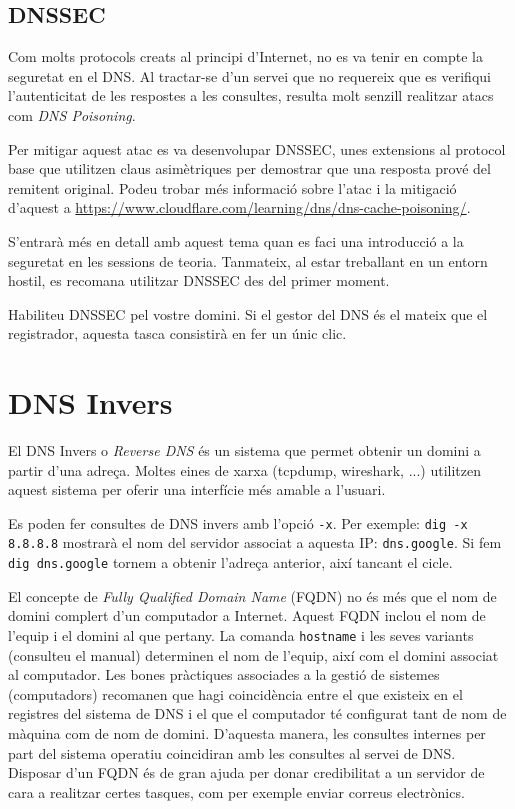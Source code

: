 \documentclass{practicaitic}
\begin{document}
\subsection{DNSSEC}

Com molts protocols creats al principi d'Internet, no es va tenir en compte
la seguretat en el DNS. Al tractar-se d'un servei que no requereix que es
verifiqui l'autenticitat de les respostes a les consultes, resulta molt
senzill realitzar atacs com \textit{DNS Poisoning}.

Per mitigar aquest atac es va desenvolupar DNSSEC, unes extensions al
protocol base que utilitzen claus asimètriques per demostrar que una
resposta prové del remitent original.
Podeu trobar més informació sobre l'atac i la mitigació d'aquest a
\url{https://www.cloudflare.com/learning/dns/dns-cache-poisoning/}.

S'entrarà més en detall amb aquest tema quan es faci una introducció a la
seguretat en les sessions de teoria. Tanmateix, al estar treballant en un
entorn hostil, es recomana utilitzar DNSSEC des del primer moment.

\begin{tasca}
  Habiliteu DNSSEC pel vostre domini. Si el gestor del DNS és el mateix
  que el registrador, aquesta tasca consistirà en fer un únic clic.
\end{tasca}

\section{DNS Invers}

El DNS Invers o \textit{Reverse DNS} és un sistema que permet obtenir un
domini a partir d'una adreça. Moltes eines de xarxa (tcpdump, wireshark, ...)
utilitzen aquest sistema per oferir una interfície més amable a l'usuari.

Es poden fer consultes de DNS invers amb l'opció \verb|-x|.
Per exemple: \verb|dig -x 8.8.8.8| mostrarà el nom del servidor associat
a aquesta IP: \verb|dns.google|. Si fem \verb|dig dns.google| tornem a obtenir
l'adreça anterior, així tancant el cicle.

El concepte de \textit{Fully Qualified Domain Name} (FQDN) no és més
que el nom de domini complert d'un computador a Internet. Aquest FQDN
inclou el nom de l'equip i el domini al que pertany. La comanda
\verb|hostname| i les seves variants (consulteu el manual) determinen
el nom de l'equip, així com el domini associat al computador. Les
bones pràctiques associades a la gestió de sistemes (computadors)
recomanen que hagi coincidència entre el que existeix en el registres
del sistema de DNS i el que el computador té configurat tant de nom de
màquina com de nom de domini. D'aquesta manera, les consultes internes
per part del sistema operatiu coincidiran amb les consultes al servei
de DNS. Disposar d'un FQDN és de gran ajuda per donar credibilitat a
un servidor de cara a realitzar certes tasques, com per exemple enviar
correus electrònics.
\end{document}
